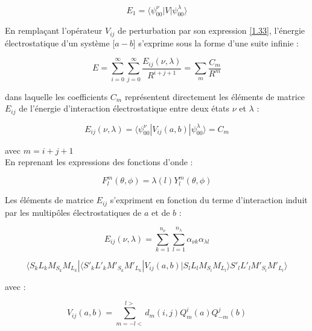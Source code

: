 	\begin{equation}
	E_{1} = \langle \psi_{00}^{\nu}|V| \psi_{00}^{\lambda}\rangle
	\end{equation}
	
	
	En remplaçant l'opérateur $V_{ij}$ de perturbation par son expression \ref{1.33}, l'énergie électrostatique d'un système [$a-b$] s'exprime sous la forme d'une suite infinie : 
	
	\begin{equation}
	E = \sum_{i=0}^{\infty} \sum_{j=0}^{\infty} \frac{E_{ij} (\nu,\lambda)}{R^{i+j+1}} = \sum_{m} \frac{C_{m}}{R^{m}}
	\end{equation}
	
	\noindent dans laquelle les coefficients $C_{m}$ représentent directement les éléments de matrice $E_{ij}$ de l'énergie d'interaction électrostatique entre deux états $\nu$ et $\lambda$ : 
	
	\begin{equation}
	E_{ij}(\nu, \lambda) = \langle \psi_{00}^{\nu}|V_{ij}(a,b)|\psi_{00}^{\lambda} \rangle = C_{m}
	\end{equation}
	
	\noindent avec $m= i+j+1$ \\
	En reprenant les expressions des fonctions d'onde :
	
	\begin{equation}
	F_{l}^{m} (\theta,\phi) = \lambda (l)Y_{l}^{m} (\theta,\phi)
	\end{equation}
	
	Les éléments de matrice $E_{ij}$ s'expriment en fonction du terme d'interaction induit par les multipôles électrostatiques de $a$ et de $b$ : 
	
	\begin{equation*}
	E_{ij} (\nu , \lambda) = \sum_{k=1}^{n_{\nu}} \sum_{l=1}^{n_{\lambda}} \alpha_{\nu k} \alpha_{\lambda l}
	\end{equation*}
	
	\begin{equation}
	\langle S_{k}L_{k}M_{S_{k}}M_{L_{k}}|\langle S'_{k}L'_{k}M'_{S_{k}}M'_{L_{k}}| V_{ij}(a,b)| S_{l}L_{l}M_{S_{l}} M_{L_{l}} \rangle S'_{l}L'_{l}M'_{S_{l}}M'_{L_{l}} \rangle
	\end{equation}
	
	\noindent avec : 
	
	\begin{equation}
	V_{ij}(a,b) = \sum_{m=-l<}^{l>} d_{m}(i,j) Q_{m}^{i}(a) Q_{-m}^{j}(b) 
	\end{equation}
	
